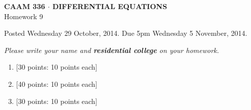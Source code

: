 \documentclass[10pt]{article}
\begin{document}
\vspace*{-5em}
\begin{center}
\large \textsf{\textbf{CAAM 336 $\cdot$ DIFFERENTIAL EQUATIONS}\\[0.5em]
Homework 9 }
\end{center}

Posted Wednesday 29 October, 2014.  Due 5pm Wednesday 5 November, 2014.
\begin{center}
\emph{Please write your name and \textbf{residential college} on your homework.}
\end{center}

\begin{enumerate}
\item {[30 points: 10 points each]}\\  
\newpage
\item {[40 points: 10 points each]}\\  
\newpage
\item {[30 points: 10 points each]}\\  


\end{enumerate}
\end{document}
